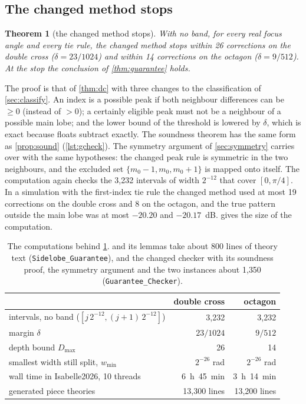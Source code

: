 \documentclass[11pt]{amsart}
\theoremstyle{plain}
\newtheorem{theorem}{Theorem}
\theoremstyle{definition}
\newcommand{\thy}[1]{\texttt{#1}}
\begin{document}
\subsection{The changed method stops}

\begin{theorem}[the changed method stops]\label{thm:gstops}
With no band, for every real focus angle and every tie rule, the changed method stops within 26
corrections on the double cross ($\delta = 23/1024$) and within 14 corrections on the octagon
($\delta = 9/512$).  At the stop the conclusion of \cref{thm:guarantee} holds.
\end{theorem}

The proof is that of \cref{thm:dc} with three changes to the classification of \cref{sec:classify}.  An
index is a possible peak if both neighbour differences can be $\ge 0$ (instead of $> 0$); a certainly
eligible peak must not be a neighbour of a possible main lobe; and the lower bound of the threshold is
lowered by $\delta$, which is exact because floats subtract exactly.  The soundness theorem has the same
form as \cref{prop:sound} (\cref{lst:gcheck}).  The symmetry argument of \cref{sec:symmetry} carries over
with the same hypotheses: the changed peak rule is symmetric in the two neighbours, and the excluded set
$\{m_0 - 1, m_0, m_0 + 1\}$ is mapped onto itself.  The computation again checks the 3{,}232 intervals of
width $2^{-12}$ that cover $[0, \pi/4]$.  In a simulation with the first-index tie rule the changed method
used at most 19 corrections on the double cross and 8 on the octagon, and the true pattern outside the
main lobe was at most $-20.20$ and $-20.17$~dB.   gives the size of the
computation.

\begin{table}[t]
\centering\small
\begin{tabular}{@{}lrr@{}}
\toprule
 & double cross & octagon\\
\midrule
intervals, no band ($[j\,2^{-12}, (j+1)\,2^{-12}]$) & 3{,}232 & 3{,}232\\
margin $\delta$ & $23/1024$ & $9/512$\\
depth bound $D_{\max}$ & 26 & 14\\
smallest width still split, $w_{\min}$ & $2^{-26}$ rad & $2^{-26}$ rad\\
wall time in Isabelle2026, 10 threads & 6~h~45~min & 3~h~14~min\\
generated piece theories & 13{,}300 lines & 13{,}200 lines\\
\bottomrule
\end{tabular}
\caption{The computations behind \cref{thm:gstops}.   and its lemmas take about
800 lines of theory text (\thy{Sidelobe\_Guarantee}), and the changed checker with its soundness
proof, the symmetry argument and the two instances about 1{,}350 (\thy{Guarantee\_Checker}).}
\label{tab:gcomputation}
\end{table}
\end{document}

